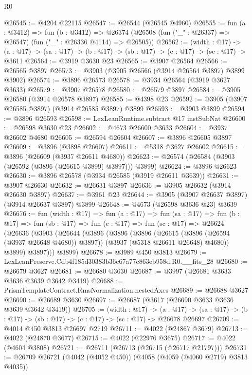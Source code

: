 \begin{lexlean}{R0}
\begin{coremodule}
@26545 := @4204 @22115
@26547 := @26544 (@26545 @4960)
@26555 := fun (a : @3412) =>
  fun (b : @3412) =>
  @26374 (@26508 (fun ("_" : @26337) => @26547) (fun ("_" : @26336 @4114) => @26505))
@26562 := (width : @17) ->
  (a : @17) -> (sa : @17) -> (b : @17) -> (sb : @17) -> (c : @17) -> (sc : @17) -> @3611
@26564 := @3919 @3630 @23
@26565 := @3907 @26564
@26566 := @26565 @3897
@26573 := @3903 (@3905 @26566 (@3914 @26564 @3897) @3899 @3902)
@26574 := @3896 @26573
@26578 := @3934 @26564 (@3919 @3627 @3633)
@26579 := @3907 @26578
@26580 := @26579 @3897
@26584 := @3905 @26580 (@3914 @26578 @3897)
@26585 := @4398 @23
@26592 := @3905 (@3907 @26585 @3897) (@3914 @26585 @3897) @3899
@26593 := @3903 @3899
@26594 := @3896 @26593
@26598 := LexLeanRuntime.subtract @17 instSubNat
@26600 := @26598 @3630 @23
@26602 := @4673 @26600 @3633
@26604 := @3937 @26602 @4680
@26605 := @26594 @26604
@26607 := @3896 @26605 @3897
@26609 := @3896 (@3898 @26607)
@26611 := @5318 @3627 @26602
@26615 := @3896 (@26609 (@3937 @26611 @4680))
@26623 := @26574 (@26584 (@3903 (@26592 (@3896 (@26615 @3899) @3897))) @3899)
@26624 := @3896 @26623
@26630 := @3896 @26578 (@3934 @26585 (@3919 @26611 @3639))
@26631 := @3907 @26630
@26632 := @26631 @3897
@26636 := @3905 @26632 (@3914 @26630 @3897)
@26637 := @3961 @23
@26644 := @3905 (@3907 @26637 @3897) (@3914 @26637 @3897) @3899
@26648 := @4673 (@26598 @3636 @23) @3639
@26676 := fun (width : @17) =>
  fun (a : @17) =>
  fun (sa : @17) =>
  fun (b : @17) =>
  fun (sb : @17) =>
  fun (c : @17) =>
  fun (sc : @17) =>
  @26624
    (@26636
      (@3903
        (@26644
          (@3896
            (@3896
              (@3896
                (@26615 (@3896 (@26594 (@3937 @26648 @4680)) @3897))
                (@3937 (@5318 @26611 @26648) @4680))
              @3899)
            @3897)))
      @3899)
@26678 := @3989 @450 @3813
@26679 := LexLeanPreserve.Cdb4f185d30383b36c67a77c863eb958d.R0.__fits_28
@26680 := @26679 @3627
@26681 := @26680 @3630
@26687 := @3997 (@26681 @3633 @3636 @3639 @3642 @3419)
@26688 := PrismTemplateContract.RmsNormalization.nestedAxes
@26689 := @26688 @3627
@26690 := @26689 @3630
@26697 := @26687 (@3617 (@26690 @3633 @3636 @3639 @3642 @3419))
@26705 := (width : @17) ->
  (a : @17) -> (sa : @17) -> (b : @17) -> (sb : @17) -> (c : @17) -> (sc : @17) -> @26678 @26697
@26709 := @4014 @450 @3813 @26697 @2719
@26711 := @4022 (@24867 @3679)
@26713 := @4022 (@24870 @3677)
@26715 := @4022 (@22976 @3675)
@26717 := @4022 (@4604 @3808)
@26721 := @26711 (@26713 (@26715 (@26717 @21797)))
@26731 := @26709 @26721 (@4042 (@4052 @450)) (@4058 (@4059 (@4060 @2719) @3813 @4035))

\end{coremodule}
\end{lexlean}
